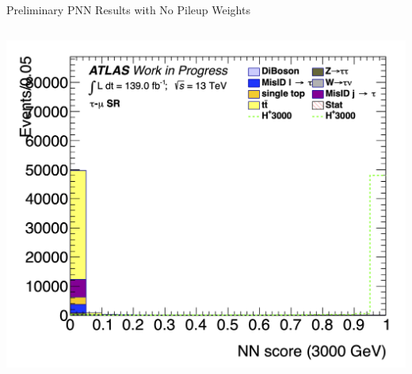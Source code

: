 \documentclass[aspectratio=169,xcolor=table]{beamer}
\begin{document}
\begin{frame}{Preliminary PNN Results with No Pileup Weights}
\begin{columns}
        \includegraphics[height=.24\textheight,keepaspectratio=true]{Scores/taulep/myOutDirClfEval_1p_noUpsilon_test_full/clf_score_GB200_mass_3000to3000_SR_TAUMU.png}
      \end{columns}
    \end{frame}
\end{document}
